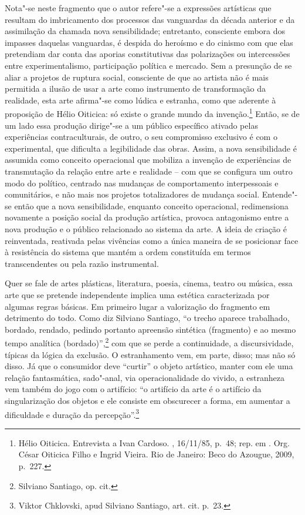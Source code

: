 Nota"-se neste fragmento que o autor refere"-se a expressões artísticas
que resultam do imbricamento dos processos das vanguardas da década
anterior e da assimilação da chamada nova sensibilidade; entretanto,
consciente embora dos impasses daquelas vanguardas, é despida do
heroísmo e do cinismo com que elas pretendiam dar conta das aporias
constitutivas das polarizações ou intercessões entre experimentalismo,
participação política e mercado. Sem a presunção de se aliar a projetos
de ruptura social, consciente de que ao artista não é mais permitida a
ilusão de usar a arte como instrumento de transformação da realidade,
esta arte afirma"-se como lúdica e estranha, como que aderente à
proposição de Hélio Oiticica: só existe o grande mundo da
invenção.\footnote{Hélio Oiticica. Entrevista a Ivan Cardoso.
  {}, 16/11/85, p.~48; rep. em
  {}. Org. César Oiticica Filho e Ingrid
  Vieira. Rio de Janeiro: Beco do Azougue, 2009, p.~227.} Então, se de
um lado essa produção dirige"-se a um público específico ativado pelas
experiências contraculturais, de outro, o seu compromisso exclusivo é
com o experimental, que dificulta a legibilidade das obras. Assim, a
nova sensibilidade é assumida como conceito operacional que mobiliza a
invenção de experiências de transmutação da relação entre arte e
realidade -- com que se configura um outro modo do político, centrado
nas mudanças de comportamento interpessoais e comunitários, e não mais
nos projetos totalizadores de mudança social. Entende"-se então que a
nova sensibilidade, enquanto conceito operacional, redimensiona
novamente a posição social da produção artística, provoca antagonismo
entre a nova produção e o público relacionado ao sistema da arte. A
ideia de criação é reinventada, reativada pelas vivências como a única
maneira de se posicionar face à resistência do sistema que mantém a
ordem constituída em termos transcendentes ou pela razão instrumental.

Quer se fale de artes plásticas, literatura, poesia, cinema, teatro ou
música, essa arte que se pretende independente implica uma estética
caracterizada por algumas regras básicas. Em primeiro lugar a
valorização do fragmento em detrimento do todo. Como diz Silviano
Santiago, ``o trecho aparece trabalhado, bordado, rendado, pedindo
portanto apreensão sintética (fragmento) e ao mesmo tempo analítica
(bordado)'',\footnote{Silviano Santiago, op. cit.} com que se perde a
continuidade, a discursividade, típicas da lógica da exclusão. O
estranhamento vem, em parte, disso; mas não só disso. Já que o
consumidor deve ``curtir'' o objeto artístico, manter com ele uma
relação fantasmática, sado"-anal, via operacionalidade do vivido, a
estranheza vem também do jogo com o artifício: ``o artifício da arte é
o artifício da singularização dos objetos e ele consiste em obscurecer a
forma, em aumentar a dificuldade e duração da percepção''.\footnote{Viktor
  Chklovski, apud Silviano Santiago, art. cit. p.~23.}

